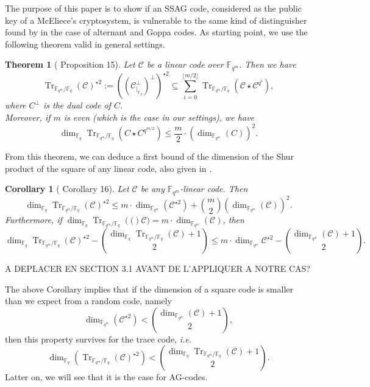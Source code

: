 \documentclass[a4paper]{article}
\newtheorem{coro1}{Corollary}
\newtheorem{thm}{Theorem}
\newcommand{\calC}{\mathcal{C}}
\newcommand{\fqm}{\mathbb{F}_{q^m}}
\newcommand{\fq}{\mathbb{F}_{q}}
\newcommand{\Tr}[1]{\operatorname{Tr}_{\mathbb{F}_{q^m}/\fq}\left(#1\right)}
\begin{document}
{\color{brown}
The purpose of this paper is to show if an \textrm{SSAG} code, considered as the public key of a McEliece's cryptosystem, is vulnerable to the same kind of distinguisher found by \cite{rocco} in the case of alternant and Goppa codes. As starting point, we use the following theorem valid in general settings.


\begin{thm}[\cite{rocco} Proposition 15] \label{th:Tr_BoundSchurSquare}
Let $\calC$ be a linear code over $\fqm$. Then we have 
		\[ \Tr{\calC}^{\star2} := ((\calC^{\perp}_{|_{{\mathbb{F}_q}}})^{\perp})^{\star2} \subseteq \sum\limits_{i=0}^{\lfloor{m/2} \rfloor} \Tr{\calC\star \calC^{q^i}},\]
		where $C^{\perp}$ is the dual code of $C$. \\
		Moreover, if $m$ is even (which is the case in our settings), we have 
		\[\dim_{\mathbb{F}_q}\Tr{ C \star C^{q^{m/2}}} \leq \frac{m}{2}\cdot \left(\dim_{\fqm}(C)\right)^2.\]
\end{thm}

From this theorem, we can deduce a first bound of the dimension of the Shur product of the square of any linear code, also given in \cite{rocco}.

\begin{coro1} [\cite{rocco} Corollary 16]\label{coro:first_bound_square_of_trace}
Let $\calC$ be any $\fqm$-linear code. Then 
\begin{equation} \label{bbbound}
    \dim_{\fq}\Tr{\calC}^{\star2} \leq m \cdot \dim_{\fqm}(\calC^{\star 2}) + \binom{m}{2} (\dim_{\fqm}(\calC))^2.
\end{equation}
Furthermore, if $\dim_{\fq} \Tr(\calC) = m \cdot \dim_{\fqm}(\calC)$, then 
\[\dim_{\fq} \Tr{\calC}^{\star2} - \binom{\dim_{\fq} \Tr{\calC}+1}{2} \leq m \cdot \dim_{\fqm} \calC^{\star 2} - \binom{\dim_{\fqm} (\calC)+1}{2}.\]
\end{coro1}

 {\color{red}A DEPLACER EN SECTION 3.1 AVANT DE L'APPLIQUER A NOTRE CAS? } 
 
The above Corollary implies that if the dimension of a square code is smaller than we expect from a random code, namely
\[ \dim_{\fqm} (\calC^{\star 2}) < \binom{\dim_{\fqm} (\calC)+1}{2},\]
then this property survives for the trace code, \emph{\textit{i.e.}}
\[\dim_{\fq} (\Tr{\calC}^{\star 2}) < \binom{\dim_{\fq} \Tr{\calC}+1}{2}.\]
Latter on, we will see that it is the case for AG-codes.
}



\end{document}
